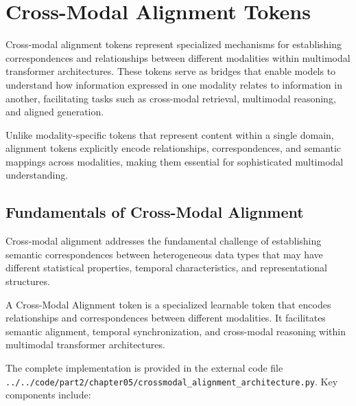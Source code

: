 
\section{Cross-Modal Alignment Tokens}

Cross-modal alignment tokens represent specialized mechanisms for establishing correspondences and relationships between different modalities within multimodal transformer architectures. These tokens serve as bridges that enable models to understand how information expressed in one modality relates to information in another, facilitating tasks such as cross-modal retrieval, multimodal reasoning, and aligned generation.
\begin{comment}
Feedback: This is a good definition. To make it more intuitive, you could use an analogy: "If modality-specific tokens ([IMG], [AUDIO]) are like nouns representing 'what' is in the input, alignment tokens are like verbs and prepositions, representing the relationships 'between' them. They learn to answer questions like 'Is this sound *coming from* that object?' or 'Does this text *describe* that image?'"
\end{comment}

Unlike modality-specific tokens that represent content within a single domain, alignment tokens explicitly encode relationships, correspondences, and semantic mappings across modalities, making them essential for sophisticated multimodal understanding.

\subsection{Fundamentals of Cross-Modal Alignment}

Cross-modal alignment addresses the fundamental challenge of establishing semantic correspondences between heterogeneous data types that may have different statistical properties, temporal characteristics, and representational structures.

\begin{definition}
A Cross-Modal Alignment token is a specialized learnable token that encodes relationships and correspondences between different modalities. It facilitates semantic alignment, temporal synchronization, and cross-modal reasoning within multimodal transformer architectures.
\end{definition}

The complete implementation is provided in the external code file \texttt{../../code/part2/chapter05/crossmodal\_alignment\_architecture.py}. Key components include:

